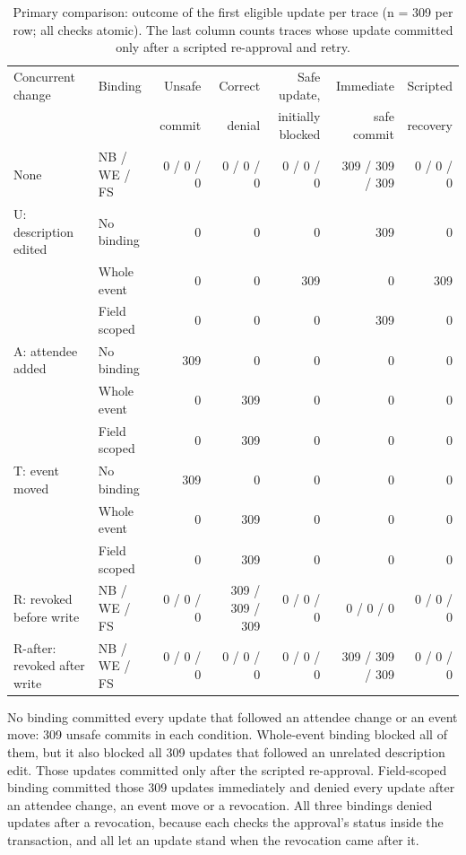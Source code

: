 \begin{table}[t]
\caption{Primary comparison: outcome of the first eligible update per trace (n = 309 per row; all checks atomic). The last column counts traces whose update committed only after a scripted re-approval and retry.}
\label{tab:primary}
\centering
\footnotesize
\setlength{\tabcolsep}{4pt}
\begin{tabular}{llrrrrr}
\toprule
Concurrent change & Binding & Unsafe & Correct & Safe update, & Immediate & Scripted \\
 & & commit & denial & initially blocked & safe commit & recovery \\
\midrule
None & NB / WE / FS & 0 / 0 / 0 & 0 / 0 / 0 & 0 / 0 / 0 & 309 / 309 / 309 & 0 / 0 / 0 \\
U: description edited & No binding & 0 & 0 & 0 & 309 & 0 \\
 & Whole event & 0 & 0 & 309 & 0 & 309 \\
 & Field scoped & 0 & 0 & 0 & 309 & 0 \\
A: attendee added & No binding & 309 & 0 & 0 & 0 & 0 \\
 & Whole event & 0 & 309 & 0 & 0 & 0 \\
 & Field scoped & 0 & 309 & 0 & 0 & 0 \\
T: event moved & No binding & 309 & 0 & 0 & 0 & 0 \\
 & Whole event & 0 & 309 & 0 & 0 & 0 \\
 & Field scoped & 0 & 309 & 0 & 0 & 0 \\
R: revoked before write & NB / WE / FS & 0 / 0 / 0 & 309 / 309 / 309 & 0 / 0 / 0 & 0 / 0 / 0 & 0 / 0 / 0 \\
R-after: revoked after write & NB / WE / FS & 0 / 0 / 0 & 0 / 0 / 0 & 0 / 0 / 0 & 309 / 309 / 309 & 0 / 0 / 0 \\
\bottomrule
\end{tabular}
\end{table}

No binding committed every update that followed an attendee change or an event move: 309 unsafe commits in each condition. Whole-event binding blocked all of them, but it also blocked all 309 updates that followed an unrelated description edit. Those updates committed only after the scripted re-approval. Field-scoped binding committed those 309 updates immediately and denied every update after an attendee change, an event move or a revocation. All three bindings denied updates after a revocation, because each checks the approval's status inside the transaction, and all let an update stand when the revocation came after it.

